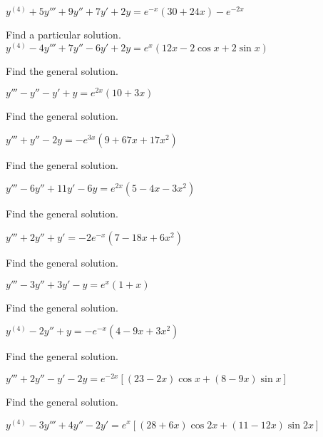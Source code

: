 \documentclass{ximera}
\begin{document}
\begin{problem}\label{exer:9.3.58}
$y^{(4)}+5y'''+9y''+7y'+2y=e^{-x}(30+24x)-e^{-2x}$
\end{problem}

\begin{problem}\label{exer:9.3.59}   Find a particular solution.   $y^{(4)}-4y'''+7y''-6y'+2y=e^x(12x-2\cos
x+2\sin x)$
\end{problem}

\begin{problem}\label{exer:9.3.60}   Find the general solution.

$y'''-y''-y'+y=e^{2x}(10+3x)$
\end{problem}

\begin{problem}\label{exer:9.3.61}   Find the general solution. 

$y'''+y''-2y=-e^{3x}(9+67x+17x^2)$
\end{problem}

\begin{problem}\label{exer:9.3.62}   Find the general solution.

$y'''-6y''+11y'-6y=e^{2x}(5-4x-3x^2)$
\end{problem}

\begin{problem}\label{exer:9.3.63}   Find the general solution. 

$y'''+2y''+y'=-2e^{-x}(7-18x+6x^2)$
\end{problem}

\begin{problem}\label{exer:9.3.64}   Find the general solution. 

$y'''-3y''+3y'-y=e^x(1+x)$
\end{problem}

\begin{problem}\label{exer:9.3.65}  Find the general solution.

$y^{(4)}-2y''+y=-e^{-x}(4-9x+3x^2)$
\end{problem}

\begin{problem}\label{exer:9.3.66}   Find the general solution. 

$y'''+2y''-y'-2y=e^{-2x}\left[(23-2x)\cos
x+(8-9x)\sin x\right]$
\end{problem}

\begin{problem}\label{exer:9.3.67}   Find the general solution.

$y^{(4)}-3y'''+4y''-2y'=e^x\left[(28+6x)\cos
2x+(11-12x)\sin2x\right]$
\end{problem}
\end{document}
